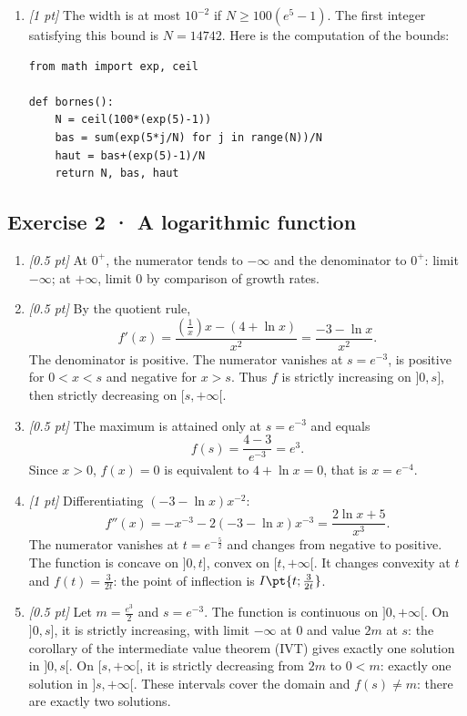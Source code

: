 \begin{enumerate}

\item \textit{[1 pt]} The width is at most $10^{-2}$ if $N\ge100(e^{5}-1)$. The first integer satisfying this bound is $N=14742$. Here is the computation of the bounds:
\begin{lstlisting}
from math import exp, ceil

def bornes():
    N = ceil(100*(exp(5)-1))
    bas = sum(exp(5*j/N) for j in range(N))/N
    haut = bas+(exp(5)-1)/N
    return N, bas, haut
\end{lstlisting}


\end{enumerate}

\subsection*{Exercise 2 · A logarithmic function}\begin{enumerate}

\item \textit{[0.5 pt]} At $0^+$, the numerator tends to $-\infty$ and the denominator to $0^+$: limit $-\infty$; at $+\infty$, limit $0$ by comparison of growth rates.

\item \textit{[0.5 pt]} By the quotient rule,
\[f'(x)=\frac{(\frac{1}{x})x-(4+\ln x)}{x^2}=\frac{-3-\ln x}{x^2}.\]
The denominator is positive. The numerator vanishes at $s=e^{-3}$, is positive for $0<x<s$ and negative for $x>s$. Thus $f$ is strictly increasing on $]0,s]$, then strictly decreasing on $[s,+\infty[$.

\item \textit{[0.5 pt]} The maximum is attained only at $s=e^{-3}$ and equals
\[f(s)=\frac{4- 3}{e^{-3}}=e^{3}.\]
Since $x>0$, $f(x)=0$ is equivalent to $4+\ln x=0$, that is $x=e^{-4}$.

\item \textit{[1 pt]} Differentiating $(-3-\ln x)x^{-2}$:
\[f''(x)=-x^{-3}-2(-3-\ln x)x^{-3}=\frac{2\ln x+5}{x^3}.\]
The numerator vanishes at $t=e^{-\frac{5}{2}}$ and changes from negative to positive. The function is concave on $]0,t]$, convex on $[t,+\infty[$. It changes convexity at $t$ and $f(t)=\frac{3}{2t}$: the point of inflection is $I\pt{t;\frac{3}{2t}}$.

\item \textit{[0.5 pt]} Let $m=\frac{e^{3}}{2}$ and $s=e^{-3}$. The function is continuous on $]0,+\infty[$. On $]0,s]$, it is strictly increasing, with limit $-\infty$ at $0$ and value $2m$ at $s$: the corollary of the intermediate value theorem (IVT) gives exactly one solution in $]0,s[$. On $[s,+\infty[$, it is strictly decreasing from $2m$ to $0<m$: exactly one solution in $]s,+\infty[$. These intervals cover the domain and $f(s)\ne m$: there are exactly two solutions.


\end{enumerate}
